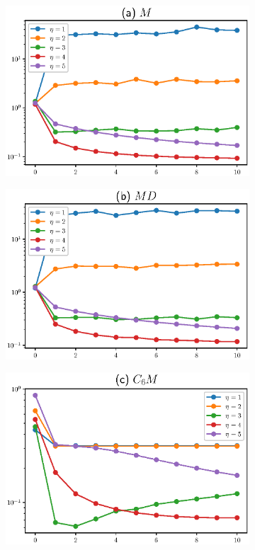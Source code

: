 \begin{figure}[!p]
	\begin{center}
		\caption{Dinâmica inicial de arquiteturas selecionadas.}\label{loss_val}
		\begin{subfigure}{.5\textwidth}
			\centering
			\includegraphics[width=0.95\linewidth]{figuras/RMch.eps}
		\end{subfigure}\hfill%
		\begin{subfigure}{.5\textwidth}
			\centering
			\includegraphics[width=0.95\linewidth]{figuras/RMchD.eps}
		\end{subfigure}\hfill%
		\newline
		\begin{subfigure}{.5\textwidth}
			\centering
			\includegraphics[width=0.95\linewidth]{figuras/C5o6RMch.eps}

\end{subfigure}
\end{center}
\end{figure}
